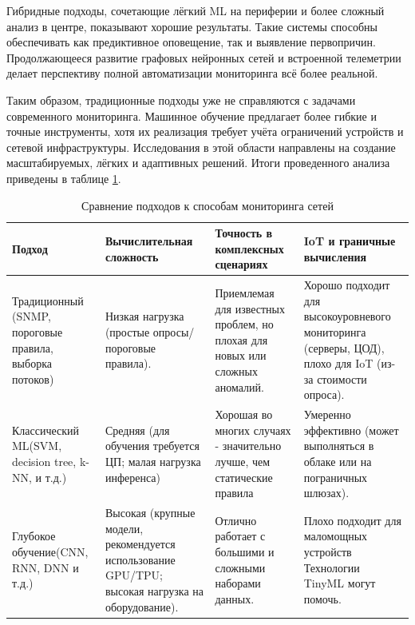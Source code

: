 Гибридные подходы, сочетающие лёгкий ML на периферии и более сложный анализ в центре, показывают хорошие результаты. Такие системы способны обеспечивать как предиктивное оповещение, так и выявление первопричин. Продолжающееся развитие графовых нейронных сетей и встроенной телеметрии делает перспективу полной автоматизации мониторинга всё более реальной. %

Таким образом, традиционные подходы уже не справляются с задачами современного мониторинга. Машинное обучение предлагает более гибкие и точные инструменты, хотя их реализация требует учёта ограничений устройств и сетевой инфраструктуры. Исследования в этой области направлены на создание масштабируемых, лёгких и адаптивных решений. Итоги проведенного анализа приведены в таблице \ref{tab:methods1}.


\begin{table}[htbp]
	\centering
	\caption{Сравнение подходов к способам мониторинга сетей}
	\label{tab:methods1}
	\begin{tabular}{|>{\centering\arraybackslash}p{2.28cm}|>{\centering\arraybackslash}p{3.05cm}|>{\centering\arraybackslash}p{2.23cm}|>{\centering\arraybackslash}p{2.68cm}|}
		\hline
		\textbf{Подход}  & \textbf{Вычислительная сложность} & \textbf{Точность в комплексных сценариях} & \textbf{IoT и граничные вычисления}  \\ \hline
		Традиционный (SNMP, пороговые правила, выборка потоков)  & Низкая нагрузка (простые опросы/ пороговые правила). & Приемлемая для известных проблем, но плохая  для новых или сложных аномалий. & Хорошо подходит для высокоуровневого мониторинга (серверы, ЦОД), плохо для IoT (из-за стоимости опроса). \\ \hline
		Классический ML(SVM, decision tree, k-NN, и т.д.) & Средняя (для обучения требуется ЦП; малая нагрузка инференса) & Хорошая во многих случаях - значительно лучше, чем статические правила & Умеренно эффективно (может выполняться в облаке или на пограничных шлюзах). \\ \hline 
		Глубокое обучение(CNN, RNN, DNN и т.д.) & Высокая (крупные модели, рекомендуется использование GPU/TPU; высокая нагрузка на оборудование). & Отлично работает с большими и сложными наборами данных. & Плохо подходит для маломощных устройств Технологии TinyML могут помочь.  \\ \hline
	\end{tabular}
	
\end{table}




